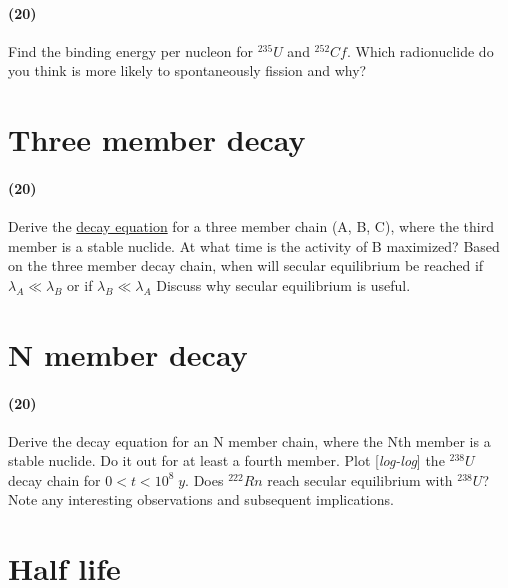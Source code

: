 \documentclass[11pt,a4paper]{article}
\begin{document}
\paragraph*{(20)} 
Find the binding energy per nucleon for $^{235}U$ and $^{252}Cf$. Which radionuclide do you think is more likely to spontaneously fission and why?





\newpage

\section{Three member decay}
\paragraph*{(20)} 
Derive the \href{https://courses.lumenlearning.com/uidaho-nuclear/chapter/radioactive-decay/}{decay equation} for a three member chain (A, B, C), where the third member is a stable nuclide. At what time is the activity of B maximized? Based on the three member decay chain, when will secular equilibrium be reached if $\lambda_A \ll \lambda_B$ or if $\lambda_B \ll \lambda_A$ Discuss why secular equilibrium is useful.





\newpage

\section{N member decay}
\paragraph*{(20)} 
Derive the decay equation for an N member chain, where the Nth member is a stable nuclide. Do it out for at least a fourth member. Plot [\textit{log-log}] the $^{238}U$ decay chain for $0<t<10^8\;y$. Does $^{222}Rn$ reach secular equilibrium with $^{238}U$? Note any interesting observations and subsequent implications.
        \vspace{0.25in}\\
        
        
        
        
        
\newpage

\section{Half life}
\end{document}
